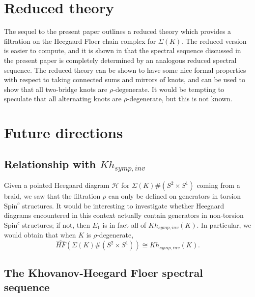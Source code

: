 \documentclass[11pt]{article}
\theoremstyle{plain} \newtheorem{thm}{Theorem}[subsection]
\theoremstyle{plain} \newtheorem{cor}[thm]{Corollary}
\theoremstyle{plain} \newtheorem{prop}[thm]{Proposition}
\theoremstyle{plain} \newtheorem{conj}[thm]{Conjecture}
\theoremstyle{plain} \newtheorem{lem}[thm]{Lemma}
\theoremstyle{definition} \newtheorem{df}[thm]{Definition}
\theoremstyle{remark} \newtheorem{rmk}[thm]{Remark}
\theoremstyle{remark} \newtheorem{obs}[thm]{Observation}
\newcommand{\DBCs}[1]{\Sigma(#1)\#(S^{2}\times S^{1})}
\newcommand{\DBC}[1]{\Sigma(#1)}
\newcommand{\h}{\mathcal{H}}
\newcommand{\HFx}[1]{\widehat{HF}(\DBCs{#1})}
\newcommand{\Kst}[1]{Kh_{symp,inv}(#1)}
\begin{document}
\section{Reduced theory}

The sequel to the present paper \cite{et:R2} outlines a reduced theory which provides a filtration on the Heegaard Floer chain complex for $\DBC{K}$.  The reduced version is easier to compute, and it is shown in \cite{et:R2} that the spectral sequence discussed in the present paper is completely determined by an analogous reduced spectral sequence.  The reduced theory can be shown to have some nice formal properties with respect to taking connected sums and mirrors of knots, and can be used to show that all two-bridge knots are $\rho$-degenerate.  It would be tempting to speculate that all alternating knots are $\rho$-degenerate, but this is not known.

\section{Future directions}
\subsection{Relationship with $Kh_{symp,inv}$}

Given a pointed Heegaard diagram $\h$ for $\DBCs{K}$ coming from a braid, we saw that the filtration $\rho$ can only be defined on generators in torsion $\text{Spin}^{c}$ structures.  It would be interesting to investigate whether Heegaard diagrams encountered in this context actually contain generators in non-torsion $\text{Spin}^{c}$ structures; if not, then $E_{1}$ is in fact all of $\Kst{K}$.  In particular, we would obtain that when $K$ is $\rho$-degenerate,
\begin{equation*}
\HFx{K} \cong \Kst{K}.
\end{equation*}

\subsection{The Khovanov-Heegard Floer spectral sequence}
\end{document}

